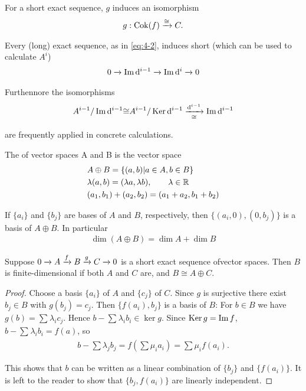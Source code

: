 For a short exact sequence, $g$ induces an isomorphism
\begin{align*}
  g:\operatorname{Cok}(f) \xrightarrow[]{\cong} C.
\end{align*}

Every (long) exact sequence, as in \eqref{eq:4-2}, induces short  (which can
be used to calculate $A^i$)
\begin{align*}
  0\xrightarrow[]{} \operatorname{Im}\mathrm{d}^{i-1} \xrightarrow[]{} \operatorname{Im}\mathrm{d}^i \xrightarrow[]{} 0
\end{align*}

Furthennore the isomorphisms
\begin{align*}
  A^{i-1}/\operatorname{Im}\mathrm{d}^{i-1} {\cong} A^{i-1}/\operatorname{Ker}\mathrm{d}^{i-1} \xrightarrow[\cong]{\mathrm{d}^{i-1}} \operatorname{Im}\mathrm{d}^{i-1}
\end{align*}

are frequently applied in concrete calculations.

The  of vector spaces A and B is the vector space
\begin{align*}
   & A\oplus B  = \{(a,b) | a\in A, b\in B\}                       \\
   & \lambda(a, b)  = (\lambda a, \lambda b), \qquad \lambda\in\mathbb{R} \\
   & (a_1, b_1) + (a_2, b_2)  = (a_1 + a_2, b_1 + b_2)
\end{align*}

If $\{a_i\}$ and $\{b_j\}$ are bases of $A$ and $B$, respectively, then $\{(a_i, 0), (0, b_j)\}$ is a
basis of $A\oplus B$. In particular
\begin{align*}
  \dim(A\oplus B) = \dim A + \dim B
\end{align*}

\begin{lemma}\label{lemma:4-1}
  Suppose $0\xrightarrow[]{}A\xrightarrow[]{f}B\xrightarrow[]{g}C\xrightarrow[]{}0$ is a short exact sequence ofvector
  spaces. Then $B$ is finite-dimensional if both $A$ and $C$ are, and $B\cong A\oplus C$.
\end{lemma}

\begin{proof}
  Choose a basis $\{a_i\}$ of $A$ and $\{c_j\}$ of $C$. Since $g$ is surjective there
  exist $b_j\in B$ with $g(b_j) = c_j$. Then $\{f(a_i), b_j\}$ is a basis of $B$: For $b\in B$
  we have $g(b) = \sum_{}^{}{\lambda_ic_j}$. Hence $b - \sum_{}^{}{\lambda_ib_i}\in\ker g$. Since
  $\operatorname{Ker} g= \operatorname{Im} f$, $b - \sum_{}^{}{\lambda_ib_i} = f(a)$, so
  \begin{align*}
    b-\sum\lambda_jb_j=f\left(\sum\mu_ia_i\right)=\sum\mu_if(a_i).
  \end{align*}

  This shows that $b$ can be written as a linear combination of $\{b_j\}$ and $\{f(a_i)\}$. It
  is left to the reader to show that $\{b_j, f(a_i)\}$ are linearly independent.
\end{proof}


